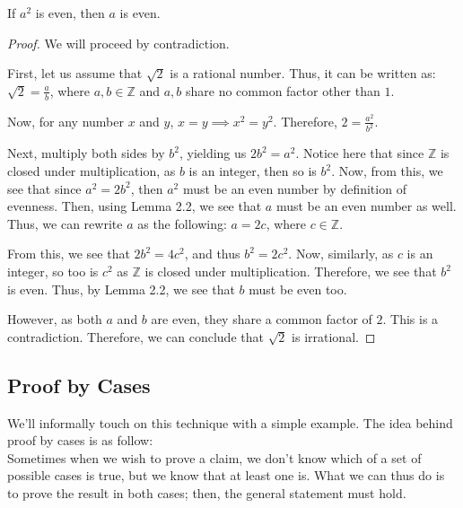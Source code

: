 \documentclass[openany]{book}
\begin{document}
\begin{lemma}
	If $a^2$ is even, then $a$ is even.
\end{lemma}
\begin{proof}
	We will proceed by contradiction.
	
	First, let us assume that $\sqrt{2}$ is a rational number. Thus, it can be written as: $\sqrt{2}=\frac{a}{b}$, where $a,b\in\mathbb{Z}$ and $a,b$ share no common factor other than $1$.
	
	Now, for any number $x$ and $y$, $x=y \implies x^2 = y^2$. Therefore, $2=\frac{a^2}{b^2}$.
	
	Next, multiply both sides by $b^2$, yielding us $2b^2=a^2$. Notice here that since $\mathbb{Z}$ is closed under multiplication, as $b$ is an integer, then so is $b^2$. Now, from this, we see that since $a^2=2b^2$, then $a^2$ must be an even number by definition of evenness. Then, using Lemma 2.2, we see that $a$ must be an even number as well. Thus, we can rewrite $a$ as the following: $a=2c$, where $c\in\mathbb{Z}$.
	
	From this, we see that $2b^2 = 4c^2$, and thus $b^2 = 2c^2$. Now, similarly, as $c$ is an integer, so too is $c^2$ as $\mathbb{Z}$ is closed under multiplication. Therefore, we see that $b^2$ is even. Thus, by Lemma 2.2, we see that $b$ must be even too.
	
	However, as both $a$ and $b$ are even, they share a common factor of $2$. This is a contradiction. Therefore, we can conclude that $\sqrt{2}$ is irrational.
\end{proof}

\subsection{Proof by Cases} We'll informally touch on this technique with a simple example. The idea behind proof by cases is as follow: \\ Sometimes when we wish to prove a claim, we don't know which of a set of possible cases is true, but we know that at least one is. What we can thus do is to prove the result in both cases; then, the general statement must hold.
\end{document}
